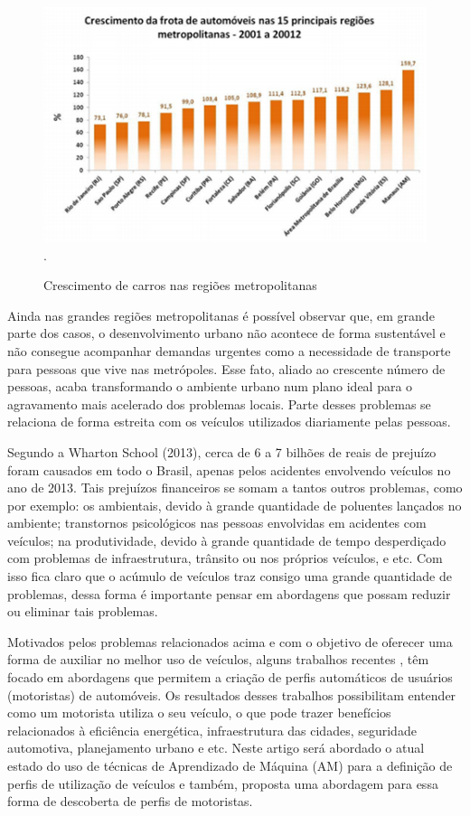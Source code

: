 \begin{figure}[ht]
\centering
\includegraphics[width=4.5in]{Imagens/carrosUpBrasil.png}.  
\caption{Crescimento de carros nas regiões metropolitanas}
\label{fig:crescimentocarros}
\end{figure}

Ainda nas grandes regiões metropolitanas é possível observar que, em grande parte dos casos, o desenvolvimento urbano não acontece de forma sustentável \cite{rolnik2011crescimento} e não consegue acompanhar demandas urgentes como a necessidade de transporte para pessoas que vive nas metrópoles. Esse fato, aliado ao crescente número de pessoas, acaba transformando o ambiente urbano num plano ideal para o agravamento mais acelerado dos problemas locais. Parte desses problemas se relaciona de forma estreita com os veículos utilizados diariamente pelas pessoas.

Segundo a Wharton School (2013)\cite{WHARTON2013}, cerca de 6 a 7 bilhões de reais de prejuízo foram causados em todo o Brasil, apenas pelos acidentes envolvendo veículos no ano de 2013. Tais prejuízos financeiros se somam a tantos outros problemas, como por exemplo: os ambientais, devido à grande quantidade de poluentes lançados no ambiente; transtornos psicológicos nas pessoas envolvidas em acidentes com veículos; na produtividade, devido à grande quantidade de tempo desperdiçado com problemas de infraestrutura, trânsito ou nos próprios veículos, e etc. Com isso fica claro que o acúmulo de veículos traz consigo uma grande quantidade de problemas, dessa forma é importante pensar em abordagens que possam reduzir ou eliminar tais problemas.

Motivados pelos problemas relacionados acima e com o objetivo de oferecer uma forma de auxiliar no melhor uso de veículos, alguns trabalhos recentes \cite{zhang2016driver,amsalu2016driver,meseguer2015assessing,eren2012estimating}, têm focado em abordagens que permitem a criação de perfis automáticos de usuários (motoristas) de automóveis. Os resultados desses trabalhos possibilitam entender como um motorista utiliza o seu veículo, o que pode trazer benefícios relacionados à eficiência energética, infraestrutura das cidades, seguridade automotiva, planejamento urbano e etc. Neste artigo será abordado o atual estado do uso de técnicas de Aprendizado de Máquina (AM) para a definição de perfis de utilização de veículos e também, proposta uma abordagem para essa forma de descoberta de perfis de motoristas.

